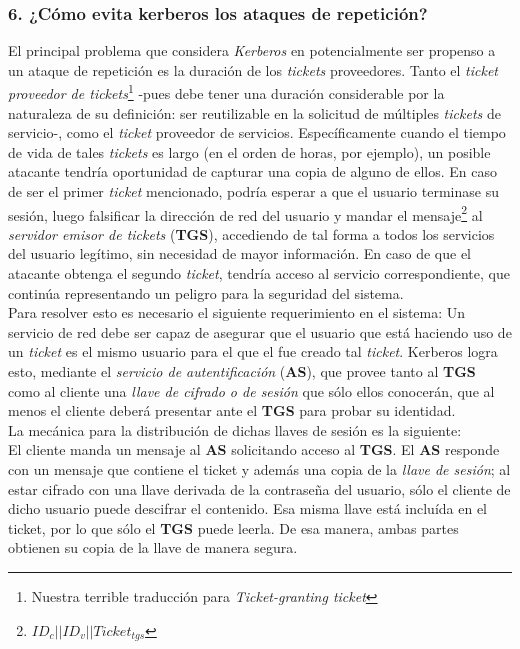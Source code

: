 \documentclass[12pt]{article}
\begin{document}
\subsubsection*{6. ¿Cómo evita kerberos los ataques de repetición?}
El principal problema que considera \textit{Kerberos} en potencialmente ser propenso a un ataque de repetición es la duración de los \textit{tickets} proveedores.
Tanto el \textit{ticket proveedor de tickets}\footnote{Nuestra terrible traducción para \textit{Ticket-granting ticket}} -pues debe tener una duración considerable por la naturaleza de su definición: ser reutilizable en la solicitud de múltiples \textit{tickets} de servicio-, como
el \textit{ticket} proveedor de servicios. Específicamente cuando el tiempo de vida de tales \textit{tickets} es largo (en el orden de horas, por ejemplo), un posible atacante tendría oportunidad de capturar una copia de alguno de ellos. En caso de ser el primer \textit{ticket} mencionado, podría esperar a que el usuario terminase su sesión, luego falsificar la dirección de red del usuario y mandar el mensaje\footnote{$ID_c||ID_v||Ticket_{tgs}$} al \textit{servidor emisor de tickets} (\textbf{TGS}), accediendo de tal forma a todos los servicios del usuario legítimo, sin necesidad de mayor información. En caso de que el atacante obtenga
el segundo \textit{ticket}, tendría acceso al servicio correspondiente, que continúa representando un peligro para la seguridad del sistema.\\

Para resolver esto es necesario el siguiente requerimiento en el sistema: Un servicio de red debe ser capaz de asegurar que el usuario que está haciendo uso de un \textit{ticket} es el mismo usuario para el que el fue creado tal \textit{ticket}. Kerberos logra esto, mediante el \textit{servicio de autentificación} (\textbf{AS}), que provee tanto al \textbf{TGS} como al cliente una \textit{llave de cifrado o de sesión} que sólo ellos conocerán, que
al menos el cliente deberá presentar ante el \textbf{TGS} para probar su identidad. \\

La mecánica para la distribución de dichas llaves de sesión es la siguiente:\\
El cliente manda un mensaje al \textbf{AS} solicitando acceso al \textbf{TGS}. El \textbf{AS} responde con un mensaje que contiene el ticket y además una copia de la \textit{llave de sesión}; al estar cifrado con una llave derivada de la contraseña del usuario, sólo el cliente de dicho usuario puede descifrar el contenido. Esa misma llave está incluída en el ticket, por lo que sólo el \textbf{TGS} puede leerla. De esa manera, ambas partes
obtienen su copia de la llave de manera segura.\\
\end{document}
